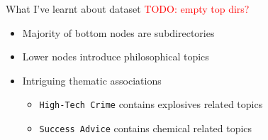 \begin{frame}{What I've learnt about \acs{dataset}}
    \textcolor{red}{TODO: empty top dirs?}
    \begin{itemize}
        \item <1-> Majority of bottom nodes are subdirectories
        \item <2-> Lower nodes introduce philosophical topics
        \item <3-> Intriguing thematic associations
        \begin{itemize}
            \item <3-> \texttt{High-Tech Crime} contains explosives related topics
            \item <3-> \texttt{Success Advice} contains chemical related topics
        \end{itemize}
    \end{itemize}
    
\end{frame}